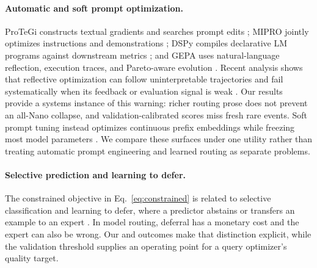 \paragraph{Automatic and soft prompt optimization.}
ProTeGi constructs textual gradients and searches prompt edits
\cite{pryzant2023protegi}; MIPRO jointly optimizes instructions and
demonstrations \cite{opsahlong2024mipro}; DSPy compiles declarative LM programs
against downstream metrics \cite{khattab2024dspy}; and GEPA uses natural-language
reflection, execution traces, and Pareto-aware evolution
\cite{agrawal2025gepa}. Recent analysis shows that reflective optimization can
follow uninterpretable trajectories and fail systematically when its feedback
or evaluation signal is weak \cite{wang2026reflection}. Our results provide a
systems instance of this warning: richer routing prose does not prevent an
all-Nano collapse, and validation-calibrated scores miss fresh rare events.
Soft prompt tuning instead optimizes continuous prefix embeddings while
freezing most model parameters \cite{lester2021prompttuning}. We compare these
surfaces under one utility rather than treating automatic prompt engineering
and learned routing as separate problems.

\paragraph{Selective prediction and learning to defer.}
The constrained objective in Eq.~\ref{eq:constrained} is related to selective
classification and learning to defer, where a predictor abstains or transfers
an example to an expert \cite{madras2018defer}. In model routing, deferral has a
monetary cost and the expert can also be wrong. Our \no and \bw outcomes make
that distinction explicit, while the validation threshold supplies an
operating point for a query optimizer's quality target.
